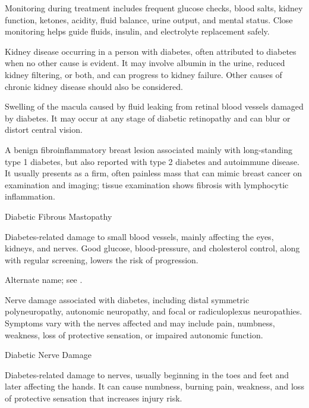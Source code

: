  Monitoring during treatment includes frequent glucose checks, blood salts, kidney function, ketones, acidity, fluid balance, urine output, and mental status. Close monitoring helps guide fluids, insulin, and electrolyte replacement safely.

 Kidney disease occurring in a person with diabetes, often attributed to diabetes when no other cause is evident. It may involve albumin in the urine, reduced kidney filtering, or both, and can progress to kidney failure. Other causes of chronic kidney disease should also be considered.




 Swelling of the macula caused by fluid leaking from retinal blood vessels damaged by diabetes. It may occur at any stage of diabetic retinopathy and can blur or distort central vision.

 A benign fibroinflammatory breast lesion associated mainly with long-standing type 1 diabetes, but also reported with type 2 diabetes and autoimmune disease.
It usually presents as a firm, often painless mass that can mimic breast cancer
on examination and imaging; tissue examination shows fibrosis with lymphocytic
inflammation.

\synonyms
Diabetic Fibrous Mastopathy

 Diabetes-related damage to small blood vessels, mainly affecting the eyes, kidneys, and nerves. Good glucose, blood-pressure, and cholesterol control, along with regular screening, lowers the risk of progression.

 Alternate name; see .

 Nerve damage associated with diabetes, including distal symmetric polyneuropathy,
autonomic neuropathy, and focal or radiculoplexus neuropathies. Symptoms vary with the nerves affected
and may include pain, numbness, weakness, loss of protective sensation, or impaired autonomic function.

\synonyms
Diabetic Nerve Damage

 Diabetes-related damage to nerves, usually beginning in the toes and feet and later affecting the hands. It can cause numbness, burning pain, weakness, and loss of protective sensation that increases injury risk.

